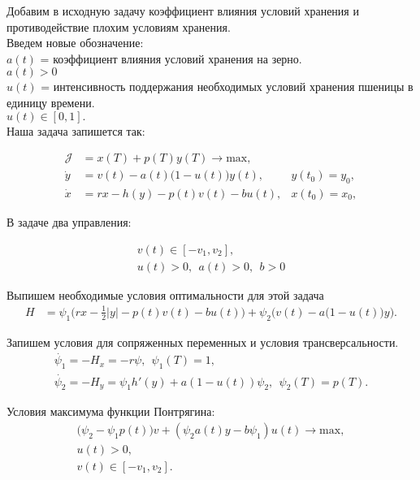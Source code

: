 {Добавим в исходную задачу коэффициент влияния условий хранения и противодействие плохим условиям хранения.\\

Введем новые обозначение:\\
${a(t)}$ = коэффициент влияния условий хранения на зерно.\\
$a(t) > 0$\\
${u(t)}$ = интенсивность поддержания необходимых условий хранения пшеницы в единицу времени.\\
$u(t) \in [0,1]. $\\

Наша задача запишется так:

\begin{align}
\mathcal{J} & = x(T) + p(T) y(T) \to \mathrm{max},\\
    \Dot{y} & = v(t) - a(t) \big (1 - u(t)\big ) y(t), & y(t_{0}) = y_{0},\\
    \Dot{x} & = r x - h(y) - p(t) v(t) - b u(t), & x(t_{0}) = x_{0}, 
\end{align}

В задаче два управления:

\begin{gather*}
    v(t) \in [-v_{1}, v_{2}], \\
     u(t) > 0, \,\;
    a(t) > 0, \,\;
     b > 0
\end{gather*}

Выпишем необходимые условия оптимальности для этой задача\\
\begin{align}
    {H} & = \psi_{1} \Big (r x- \frac{1}{2}|y| - p(t) v(t) - b u(t) \Big ) + \psi_{2} \Big (v(t) - a \big (1-u(t) \big  )y\Big).
\end{align} 

Запишем условия для сопряженных переменных и условия трансверсальности.
\begin{gather}
    \Dot{\psi_{1}} = -H_x = -r \psi,\,\;{\psi_{1}(T)} = 1, \label{g1}\\
    \Dot{\psi_{2}}  = -H_y = \psi_{1} h'(y) + a(1-u(t))\psi_{2},\;\, {\psi_{2}(T)} = p(T).\label{g2}
\end{gather} 

Условия максимума функции Понтрягина:\\
\begin{gather}
     \big (\psi_{2} - \psi_{1} p(t) \big ) v + (\psi_{2} a(t) y - b \psi_{1})u(t)  \to \mathrm{max},\\
      u(t) > 0,\nonumber\\ 
     v(t) \in [-v_{1}, v_{2}]. \nonumber
\end{gather}


}
